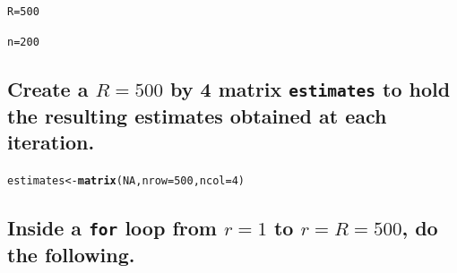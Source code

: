 \documentclass{article}\usepackage[]{graphicx}\usepackage[]{xcolor}
\makeatletter
\newcommand{\hlnum}[1]{\textcolor[rgb]{0.686,0.059,0.569}{#1}}%
\newcommand{\hlstd}[1]{\textcolor[rgb]{0.345,0.345,0.345}{#1}}%
\newcommand{\hlkwb}[1]{\textcolor[rgb]{0.69,0.353,0.396}{#1}}%
\newcommand{\hlkwc}[1]{\textcolor[rgb]{0.333,0.667,0.333}{#1}}%
\newcommand{\hlkwd}[1]{\textcolor[rgb]{0.737,0.353,0.396}{\textbf{#1}}}%
\newenvironment{kframe}{%
 \def\at@end@of@kframe{}%
 \ifinner\ifhmode%
  \def\at@end@of@kframe{\end{minipage}}%
  \begin{minipage}{\columnwidth}%
 \fi\fi%
 \def\FrameCommand##1{\hskip\@totalleftmargin \hskip-\fboxsep
 \colorbox{shadecolor}{##1}\hskip-\fboxsep
     \hskip-\linewidth \hskip-\@totalleftmargin \hskip\columnwidth}%
 \MakeFramed {\advance\hsize-\width
   \@totalleftmargin\z@ \linewidth\hsize
   \@setminipage}}%
 {\par\unskip\endMakeFramed%
 \at@end@of@kframe}
\newenvironment{knitrout}{}{} %
\makeatother
\begin{document}
\begin{knitrout}
\color{fgcolor}\begin{kframe}
\begin{alltt}
\hlstd{R} \hlkwb{=} \hlnum{500}

\hlstd{n} \hlkwb{=} \hlnum{200}
\end{alltt}
\end{kframe}
\end{knitrout}
  
  \subsection{Create a $R = 500$ by 4 matrix \texttt{estimates} to hold the resulting estimates obtained at each iteration.}
  
\begin{knitrout}
\color{fgcolor}\begin{kframe}
\begin{alltt}
\hlstd{estimates} \hlkwb{<-} \hlkwd{matrix}\hlstd{(}\hlnum{NA}\hlstd{,} \hlkwc{nrow} \hlstd{=} \hlnum{500}\hlstd{,} \hlkwc{ncol} \hlstd{=} \hlnum{4}\hlstd{)}
\end{alltt}
\end{kframe}
\end{knitrout}
  
  \subsection{Inside a \texttt{for} loop from $r = 1$ to $r = R = 500$, do the following.}
  
\end{document}
